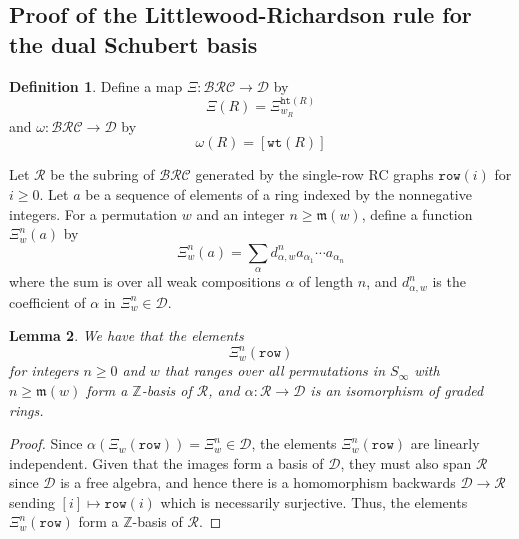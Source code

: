 \documentclass{amsart}
\makeatletter
\newcommand{\sqcupplus@inner}[2]{%
  \vcenter{\hbox{\ooalign{%
    \hfil$\m@th#1\sqcup$\hfil\cr
    \hfil\raisebox{0.15ex}{$\m@th#1\scriptscriptstyle+$}\hfil\cr
  }}}%
}
\newcommand{\sqcupplus}{\mathbin{\mathpalette\sqcupplus@inner\relax}}
\newtheorem{lemma}{Lemma}[subsection]
\theoremstyle{definition}
\newtheorem{definition}[lemma]{Definition}
\theoremstyle{remark}
\numberwithin{equation}{subsection}
\newcommand{\wof}[1]{w_{#1}}
\newcommand{\wtt}{\mathtt{wt}}
\newcommand{\hr}{\mathtt{ht}}
\newcommand{\BRC}{\mathcal{BRC}}
\newcommand{\dsch}{\ensuremath{\Xi}}
\newcommand{\dcoma}{\mathcal{D}}
\newcommand{\maxd}{\mathfrak{m}}
\makeatother
\begin{document}
\subsection{Proof of the Littlewood-Richardson rule for the dual Schubert basis}


\begin{definition}
Define a map $\Xi:\BRC\to \dcoma$ by
$$\Xi(R) = \dsch_{\wof{R}}^{\hr(R)}$$
and $\omega:\BRC\to\dcoma$ by
$$\omega(R) = [\wtt(R)]$$

Let $\mathcal{R}$  be the subring of $\BRC$ generated by the single-row RC graphs $\mathtt{row}(i)$ for $i\geq 0$. Let $a$ be a sequence of elements of a ring indexed by the nonnegative integers. For a permutation $w$ and an integer $n\geq \maxd(w)$, define a function $\dsch_w^n(a)$ by
$$\dsch_w^n(a) = \sum_{\alpha} d_{\alpha, w}^n a_{\alpha_1} \cdots a_{\alpha_n}$$
where the sum is over all weak compositions $\alpha$ of length $n$, and $d_{\alpha, w}^n$ is the coefficient of $\alpha$ in $\dsch_w^n\in\dcoma$.
\end{definition}

\begin{lemma} \label{lemma:schubertrow}
We have that the elements
$$\dsch_w^n(\mathtt{row})$$
for integers $n\geq 0$ and $w$ that ranges over all permutations in $S_\infty$ with $n\geq \maxd(w)$ form a $\mathbb{Z}$-basis of $\mathcal{R}$, and $\alpha:\mathcal{R}\to \dcoma$ is an isomorphism of graded rings.
\end{lemma}
\begin{proof}
Since $\alpha(\dsch_w(\mathtt{row})) = \dsch_w^n\in \dcoma$, the elements $\dsch_w^n(\mathtt{row})$ are linearly independent. Given that the images form a basis of $\dcoma$, they must also span $\mathcal{R}$ since $\dcoma$ is a free algebra, and hence there is a homomorphism backwards $\dcoma\to \mathcal{R}$ sending $[i]\mapsto \mathtt{row}(i)$ which is necessarily surjective. Thus, the elements $\dsch_w^n(\mathtt{row})$ form a $\mathbb{Z}$-basis of $\mathcal{R}$.
\end{proof}
\end{document}
